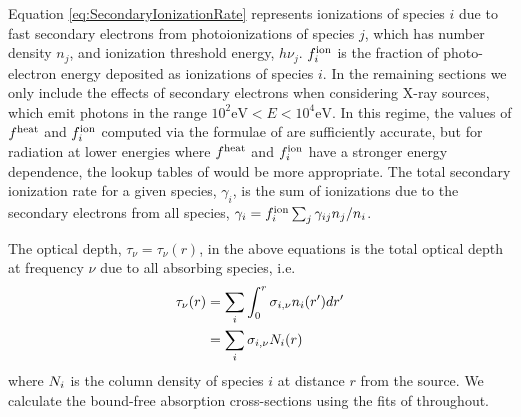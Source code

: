 \documentclass[letterpaper,titlepage,12pt]{article}
\numberwithin{equation}{section}
\begin{document}
Equation \ref{eq:SecondaryIonizationRate} represents ionizations of species
$i$ due to fast secondary electrons from photoionizations of species $j$,
which has number density $n_j$, and ionization threshold energy, $h\nu_j$.
$f_i^{\text{ion}}$ is the fraction of photo-electron energy deposited as ionizations of
species $i$. In the remaining sections we only include the effects of
secondary electrons when considering X-ray sources, which emit photons in the
range $10^2\mathrm{eV} < E < 10^4\mathrm{eV}$. In this regime, the values of
$f^{\text{heat}}$ and $f_i^{\text{ion}}$ computed via the formulae of \citet{Shull1985} are
sufficiently accurate, but for radiation at lower energies where $f^{\text{heat}}$ and
$f_i^{\text{ion}}$ have a stronger energy dependence, the lookup tables of
\citet{Furlanetto2010} would be more appropriate. The total secondary
ionization rate for a given species, $\gamma_i$, is the sum of ionizations due
to the secondary electrons from all species, $\gamma_i = f_i^{\text{ion}} \sum_j
\gamma_{ij} n_j / n_i$.

The optical depth, $\tau_{\nu} = \tau_{\nu}(r)$, in the above equations is
the total optical depth at frequency $\nu$ due to all absorbing species, i.e.
\begin{align}
    \tau_{\nu}(r) & = \sum_i \int_0^r \sigma_{i,\nu} n_i(r^{\prime}) dr^{\prime} \nonumber \\
               & = \sum_i \sigma_{i,\nu} N_i(r) \label{eq:OpticalDepth}
\end{align}
where $N_i$ is the column density of species $i$ at distance $r$ from the
source. We calculate the bound-free absorption cross-sections using the fits
of \citet{Verner1996} throughout.
\end{document}
